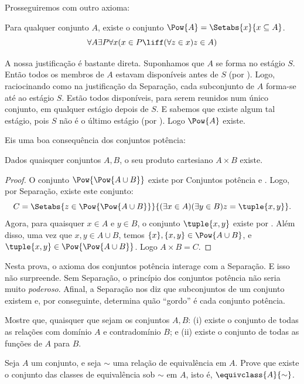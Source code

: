 \documentclass[../../../include/open-logic-section]{subfiles}
\begin{document}

Prosseguiremos com outro axioma:

\begin{axiom}
Para qualquer conjunto $A$, existe o conjunto $\Pow{A} = \Setabs{x}{x \subseteq A}$.
\[
	\forall A \exists P \forall x(x \in P \liff (\forall z \in x)z \in A)
\]
\end{axiom}

A nossa justificação é bastante direta. Suponhamos que $A$ se forma no estágio $S$. Então todos os membros de $A$ estavam disponíveis antes de
$S$ (por \stagesacc). Logo, raciocinando como na justificação da
Separação, cada subconjunto de $A$ forma-se até ao estágio $S$. Estão
todos disponíveis, para serem reunidos num único conjunto, em qualquer estágio depois de $S$.
E sabemos que existe algum tal estágio, pois $S$ não é o último
estágio (por \stagessucc). Logo $\Pow{A}$ existe.

Eis uma boa consequência dos conjuntos potência:

\begin{prop}\label{thm:Products}
Dados quaisquer conjuntos $A, B$, o seu produto cartesiano $A \times B$ existe.
\end{prop}

\begin{proof}
O conjunto $\Pow{\Pow{A \cup B}}$ existe por Conjuntos potência e
. Logo, por Separação, existe este
conjunto:
\[
	C = \Setabs{z \in \Pow{\Pow{A \cup B}}}{(\exists x \in A)(\exists y \in B) z = \tuple{x, y}}.
\]
Agora, para quaisquer $x \in A$ e $y \in B$, o conjunto $\tuple{x, y}$ existe por
. Além disso, uma vez que $x, y
\in A \cup B$, temos $\{x\}, \{x, y\} \in \Pow{A \cup B}$, e
$\tuple{x,y} \in \Pow{\Pow{A \cup B}}$. Logo $A \times B = C$.
\end{proof}

Nesta prova, o axioma dos conjuntos potência interage com a Separação. E isso não
surpreende. Sem Separação, o princípio dos conjuntos potência não seria muito
\emph{poderoso}. Afinal, a Separação nos diz que subconjuntos de um conjunto existem e, por conseguinte, determina quão ``gordo'' é cada
conjunto potência.

\begin{prob}
Mostre que, quaisquer que sejam os conjuntos $A, B$: (i) existe o conjunto de todas as relações com
domínio $A$ e contradomínio $B$; e (ii) existe o conjunto de todas as funções
de $A$ para $B$.
\end{prob}

\begin{prob}
Seja $A$ um conjunto, e seja $\sim$ uma relação de equivalência em $A$.
Prove que existe o conjunto das classes de equivalência sob $\sim$ em $A$, isto é,
$\equivclass{A}{\sim}$.
\end{prob}
\end{document}
